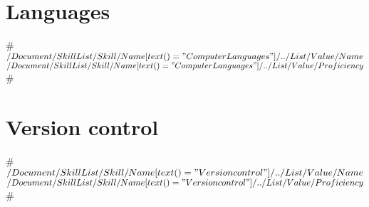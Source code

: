 \documentclass[11pt,a4paper,sans]{moderncv}   %
\begin{document}

\section{Languages}
#
{$/Document/SkillList/Skill/Name[text()="Computer Languages"]/../List/Value/Name$}
{$/Document/SkillList/Skill/Name[text()="Computer Languages"]/../List/Value/Proficiency$}
#

\section{Version control}
#
{$/Document/SkillList/Skill/Name[text()="Version control"]/../List/Value/Name$}
{$/Document/SkillList/Skill/Name[text()="Version control"]/../List/Value/Proficiency$}
#
\end{document}

